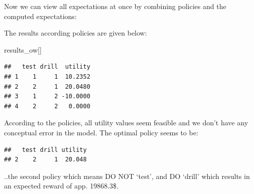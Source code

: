 \documentclass[
]{article}
\newenvironment{Shaded}{\begin{snugshade}}{\end{snugshade}}
\newcommand{\ControlFlowTok}[1]{\textcolor[rgb]{0.13,0.29,0.53}{\textbf{#1}}}
\newcommand{\DecValTok}[1]{\textcolor[rgb]{0.00,0.00,0.81}{#1}}
\newcommand{\FunctionTok}[1]{\textcolor[rgb]{0.00,0.00,0.00}{#1}}
\newcommand{\NormalTok}[1]{#1}
\newcommand{\OtherTok}[1]{\textcolor[rgb]{0.56,0.35,0.01}{#1}}
\newcommand{\SpecialCharTok}[1]{\textcolor[rgb]{0.00,0.00,0.00}{#1}}
\newcommand{\StringTok}[1]{\textcolor[rgb]{0.31,0.60,0.02}{#1}}
\begin{document}
Now we can view all expectations at once by combining policies and the computed expectations:

\begin{Shaded}
\end{Shaded}

The results according policies are given below:

\begin{Shaded}
\begin{Highlighting}[]
\NormalTok{results\_ow[]}
\end{Highlighting}
\end{Shaded}

\begin{verbatim}
##   test drill  utility
## 1    1     1  10.2352
## 2    2     1  20.0480
## 3    1     2 -10.0000
## 4    2     2   0.0000
\end{verbatim}

According to the policies, all utility values seem feasible and we don't have any conceptual error in the model.
The optimal policy seems to be:

\begin{Shaded}
\end{Shaded}

\begin{verbatim}
##   test drill utility
## 2    2     1  20.048
\end{verbatim}

..the second policy which means DO NOT `test', and DO `drill' which results in an expected reward of app. 19868.3\$.
\end{document}

